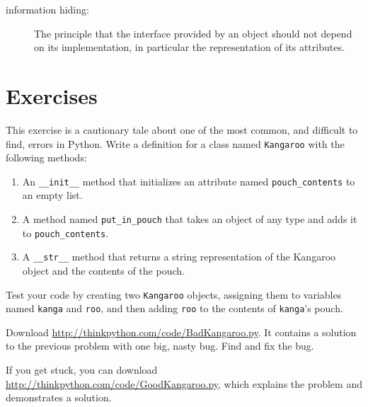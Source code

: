 \documentclass[10pt]{book}
\begin{document}
\begin{CJK}{UTF8}{gbsn}
\begin{description}
\item[information hiding:] The principle that the interface provided 
by an object should not depend on its implementation, in particular
the representation of its attributes.


\end{description}

\section{Exercises}

\begin{exercise}

This exercise is a cautionary tale about one of the most
common, and difficult to find, errors in Python.
Write a definition for a class named {\tt Kangaroo} with the following
methods:

\begin{enumerate}

\item An \verb"__init__" method that initializes an attribute named 
\verb"pouch_contents" to an empty list.

\item A method named \verb"put_in_pouch" that takes an object
of any type and adds it to \verb"pouch_contents".

\item A \verb"__str__" method that returns a string representation
of the Kangaroo object and the contents of the pouch.

\end{enumerate}
%
Test your code 
by creating two {\tt Kangaroo} objects, assigning them to variables
named {\tt kanga} and {\tt roo}, and then adding {\tt roo} to the
contents of {\tt kanga}'s pouch.

Download \url{http://thinkpython.com/code/BadKangaroo.py}.  It contains
a solution to the previous problem with one big, nasty bug.
Find and fix the bug.

If you get stuck, you can download
\url{http://thinkpython.com/code/GoodKangaroo.py}, which explains the
problem and demonstrates a solution.

\end{exercise}





\end{CJK}
\end{document}
